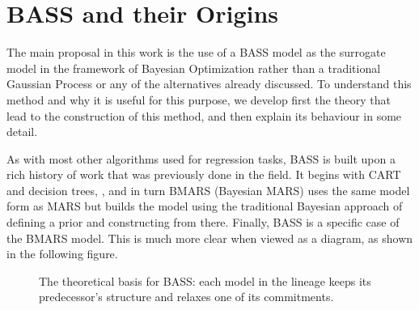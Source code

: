 \chapter{BASS and their Origins}

The main proposal in this work is the use of a BASS model as the surrogate model in the framework of Bayesian Optimization rather than a traditional Gaussian Process or any of the alternatives already discussed. To understand this method and why it is useful for this purpose, we develop first the theory that lead to the construction of this method, and then explain its behaviour in some detail. 

As with most other algorithms used for regression tasks, BASS is built upon a rich history of work that was previously done in the field. It begins with CART and decision trees, , and in turn BMARS (Bayesian MARS) uses the same model form as MARS but builds the model using the traditional Bayesian approach of defining a prior and constructing from there. Finally, BASS is a specific case of the BMARS model. This is much more clear when viewed as a diagram, as shown in the following figure. 

\begin{figure}[h]
	\centering
	\caption{The theoretical basis for BASS: each model in the lineage keeps its predecessor's structure and relaxes one of its commitments.}
	\label{building_BASS_origins}
	\end{figure}
